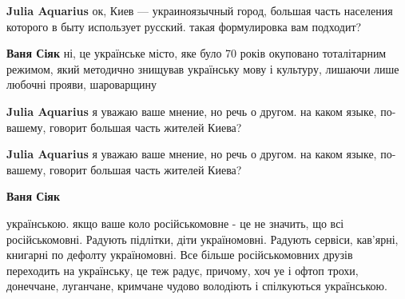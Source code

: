 \begin{itemize}
\begin{itemize}
\textbf{Julia Aquarius} ок, Киев — украиноязычный город, большая часть населения которого в быту использует русский. такая формулировка вам подходит?

 
\textbf{Ваня Сіяк} ні, це українське місто, яке було 70 років окуповано тоталітарним режимом, який методично знищував українську мову і культуру, лишаючи лише любочні прояви, шароварщину

 
\textbf{Julia Aquarius} я уважаю ваше мнение, но речь о другом. на каком языке, по-вашему, говорит большая часть жителей Киева?

 
\textbf{Julia Aquarius} я уважаю ваше мнение, но речь о другом. на каком языке, по-вашему, говорит большая часть жителей Киева?

 

\textbf{Ваня Сіяк} 

українською. якщо ваше коло російськомовне - це не значить,
що всі російськомовні. Радують підлітки, діти україномовні. Радують сервіси,
кав'ярні, книгарні по дефолту україномовні. Все більше російськомовних друзів
переходить на українську, це теж радує, причому, хоч уе і офтоп трохи,
донеччане, луганчане, кримчане чудово володіють і спілкуються українською.


 

\end{itemize}
\end{itemize}
